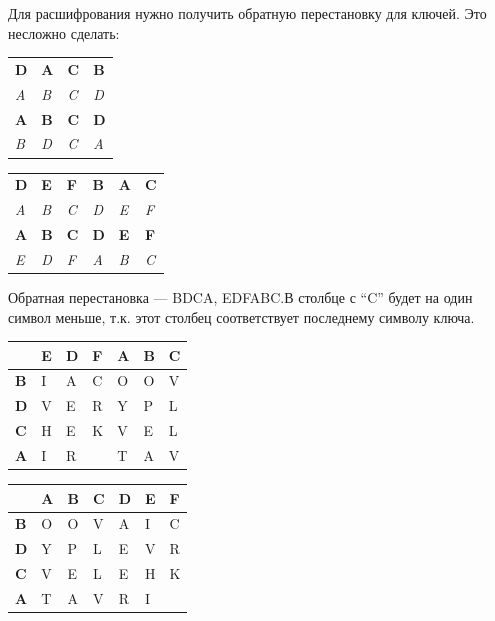 \documentclass[a4paper, 14pt]{extarticle}
\begin{document}
\begin{enumerate}
    Для расшифрования нужно получить обратную перестановку для ключей. Это несложно сделать:
    \begin{table}[h]
        \centering
        \begin{tabular}{@{}llll@{}}
        \toprule
        \textbf{D} & \textbf{A} & \textbf{C} & \textbf{B} \\
        \textit{A} & \textit{B} & \textit{C} & \textit{D} \\ \midrule
        \textbf{A} & \textbf{B} & \textbf{C} & \textbf{D} \\
        \textit{B} & \textit{D} & \textit{C} & \textit{A} \\
        \bottomrule
        \end{tabular}%
        \hspace{2cm}
        \begin{tabular}{@{}llllll@{}}
        \toprule
        \textbf{D} & \textbf{E} & \textbf{F} & \textbf{B} & \textbf{A} & \textbf{C} \\
        \textit{A} & \textit{B} & \textit{C} & \textit{D} & \textit{E} & \textit{F} \\ \midrule
        \textbf{A} & \textbf{B} & \textbf{C} & \textbf{D} & \textbf{E} & \textbf{F} \\
        \textit{E} & \textit{D} & \textit{F} & \textit{A} & \textit{B} & \textit{C} \\
        \bottomrule
        \end{tabular}
    \end{table}
    \FloatBarrier{}
    Обратная перестановка --- BDCA, EDFABC.\@ В столбце с ``C'' будет на один символ меньше, т.к. этот столбец соответствует последнему символу ключа. 
    \begin{table}[h]
        \centering
        \begin{tabular}{@{}l|llllll@{}} %
         & \textbf{E} & \textbf{D} & \textbf{F} & \textbf{A} & \textbf{B} & \textbf{C} \\ \midrule
        \textbf{B} & I & A & C & O & O & V \\
        \textbf{D} & V & E & R & Y & P & L \\
        \textbf{C} & H & E & K & V & E & L \\
        \textbf{A} & I & R &  & T & A & V
        \end{tabular}%
        \hspace{2cm}
        \begin{tabular}{@{}l|llllll@{}} %
         & \textbf{A} & \textbf{B} & \textbf{C} & \textbf{D} & \textbf{E} & \textbf{F} \\ \midrule
        \textbf{B} & O & O & V & A & I & C \\
        \textbf{D} & Y & P & L & E & V & R \\
        \textbf{C} & V & E & L & E & H & K \\
        \textbf{A} & T & A & V & R & I & 
        \end{tabular}%
    \end{table}


\end{enumerate}
\end{document}
